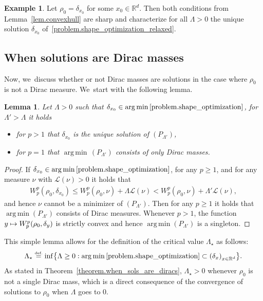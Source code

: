 \documentclass[JEP,XML,SOM,Unicode,NoFloatCountersInSection,published]{cedram}
\newcommand\mto{\mathchoice{\longmapsto}{\mapsto}{\mapsto}{\mapsto}}
\newtheorem{lemma}[theorem]{Lemma}
\theoremstyle{definition}
\newtheorem{example}[theorem]{Example}
\newcommand{\eqdef}{\ensuremath{\stackrel{\mbox{\upshape\tiny def.}}{=}}}
\newcommand{\RR}{\mathbb{R}}
\DeclareMathOperator*{\argmin}{arg\,min}
\begin{document}
\begin{example}
Let $\rho_0= \delta_{x_0}$ for some $x_0 \in \RR^d$. Then both
conditions from Lemma~\ref{lem.convexhull} are sharp and
characterize for all $\Lambda>0$ the unique solution $\delta_{x_0}$
of~\eqref{problem.shape_optimization_relaxed}.
\end{example}

\subsection{When solutions are Dirac masses}
Now, we~discuss whether or not Dirac masses are solutions in the case where $\rho_0$ is not a Dirac measure. We~start with the following lemma.

\begin{lemma}\label{lemma.trashold_lambda}
Let $\Lambda > 0$ such that $\delta_{x_0} \in \argmin\eqref{problem.shape_optimization}$,
for $\Lambda' > \Lambda$ it holds
\begin{itemize}
\item for $p > 1$ that $\delta_{x_0}$ is the unique solution
of $(P_{\Lambda'})$,
\item for $p = 1$ that $\argmin\, (P_{\Lambda'})$
consists of only Dirac masses.
\end{itemize}
\end{lemma}

\begin{proof}
If $\delta_{x_0} \in \argmin \eqref{problem.shape_optimization}$, for any $p \ge 1$, and for any measure $\nu$ with $\mathcal{L}(\nu) > 0$ it holds that
\begin{align*}
W_p^p(\rho_0, \delta_{x_0})
\le
W_p^p(\rho_0, \nu) + \Lambda \mathcal{L}(\nu)
<
W_p^p(\rho_0, \nu) + \Lambda' \mathcal{L}(\nu),
\end{align*}
and hence $\nu$ cannot be a minimizer of $(P_{\Lambda'})$. Then for any $p \ge 1$ it holds that $\argmin (P_{\Lambda'})$ consists of Dirac measures. Whenever $p > 1$, the function $y \mto W_p^p(\rho_0, \delta_y)$ is strictly convex and hence $\argmin (P_{\Lambda'})$ is a singleton.
\end{proof}

This simple lemma allows for the definition of the critical value $\Lambda_\star$ as follows:
\begin{equation}
\Lambda_\star
\eqdef
\inf
\bigl\{
\Lambda \ge 0:
\argmin \eqref{problem.shape_optimization}
\subset
\left(
\delta_{x}\right)_{x \in \RR^d}
\bigr\}.
\end{equation}
As stated in Theorem~\ref{theorem.when_sols_are_diracs}, $\Lambda_\star > 0$ whenever $\rho_0$ is not a single Dirac mass, which is a direct consequence of the convergence of solutions to $\rho_0$ when $\Lambda$ goes to $0$.
\end{document}
